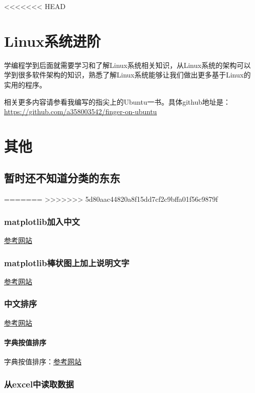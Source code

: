\documentclass[12pt,oneside]{book}
\begin{document}
\begin{common-format}
<<<<<<< HEAD
\part{Linux系统进阶}
学编程学到后面就需要学习和了解Linux系统相关知识，从Linux系统的架构可以学到很多软件架构的知识，熟悉了解Linux系统能够让我们做出更多基于Linux的实用的程序。

相关更多内容请参看我编写的指尖上的Ubuntu一书。具体github地址是：\\
\href{https://github.com/a358003542/finger-on-ubuntu}{https://github.com/a358003542/finger-on-ubuntu}






\part{其他}
\chapter{暂时还不知道分类的东东}

=======
>>>>>>> 5d80aac44820a8f15dd7cf2c9bffa01f56c9879f
\section{matplotlib加入中文}
\href{http://blog.sciencenet.cn/blog-43412-343002.html }{参考网站}

\section{matplotlib棒状图上加上说明文字}
\href{http://stackoverflow.com/questions/7423445/how-can-i-display-text-over-columns-in-a-bar-chart-in-matplotlib}{参考网站}

\section{中文排序}
\href{https://github.com/mozillazg/python-pinyin}{参考网站}

\subsection{字典按值排序}
字典按值排序：\href{http://www.cnpythoner.com/post/266.html}{参考网站}


\section{从excel中读取数据}


\end{common-format}
\end{document}
